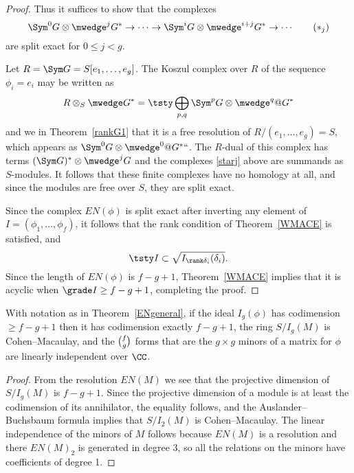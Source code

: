 \begin{proof}
Thus it suffices to show that the complexes
\begin{equation}
\Sym^{0}G\otimes\mwedge^{j}G^{*}\to\cdots \to \Sym^{i}G
\otimes  \mwedge^{i+j}G^{*}  \to \cdots
\tag{$*_j$}
\label{starj}
\end{equation}
are split exact for $0\leq j<g$.

Let $R = \Sym G = S[e_{1}, \dots, e_{g}]$. The Koszul complex over $R$
%
of the sequence $\phi_{i} = e_{i}$
may be written as
$$
R\otimes_{S} \mwedge G^* = 
\tsty\bigoplus\limits_{p,q}\Sym^{p}G\otimes\mwedge^{q}@G^*
$$
and we 
in Theorem~\ref{rankG1} that it is a free resolution
of $R/(e_1, \dots, e_g)=S$, which appears
as $\Sym^{0}G\otimes \mwedge^{0}@G^*` `$. The $R$-dual of this complex
has terms
$(\Sym G)^*\otimes\mwedge^{j}G$
and the complexes 
\eqref{starj} above are summands as $S$-modules. It follows
that these finite
complexes have no homology at all, and since the modules are free over
$S$, they are split exact.

Since the
complex $EN(\phi)$ is split exact after inverting any element of $I =
(\phi_{1}, \dots, \phi_{f})$, it follows that
the rank condition of Theorem~\ref{WMACE} is satisfied, and
$$
\tsty %
I \subset \sqrt{I_{\rank\smash{\delta_i}}(\delta_i)}.
$$
Since the length of $EN(\phi)$  is $f-g+1$, Theorem~\ref{WMACE}
implies that
it is acyclic when $\grade I\geq f-g+1$, completing the proof.
\end{proof}

\begin{corollary}\label{E-N cor}
With notation as in Theorem~\ref{ENgeneral}, if the ideal $I_g(\phi)$
has codimension $\geq f-g+1$ then it has
codimension exactly $f-g+1$, the ring $S/I_g(M)$ is Cohen--Macaulay,
and the $\tbinom{f}{g}$ forms
that are the $g\times g$ minors of a matrix for $\phi$ are linearly
independent over $\CC$.
\end{corollary}

\begin{proof}
From the resolution $EN(M)$ we see that the projective dimension of
$S/I_g(M)$ is $f-g+1$. Since the projective dimension of a module
is at least the codimension of its annihilator, the equality follows,
and the Auslander--Buchsbaum formula implies that $S/I_2(M)$ is
%
%
Cohen--Macaulay. The linear independence of the minors of $M$ follows
because $EN(M)$ is a resolution and there
$EN(M)_2$ is generated in degree 3, so all the relations on the minors
have coefficients of degree 1.
\end{proof}

